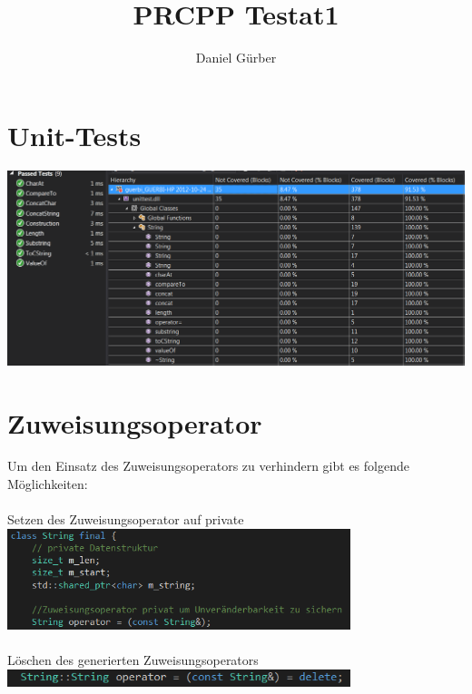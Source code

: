 \documentclass[a4paper,10pt]{article}
\title{PRCPP Testat1}
\author{Daniel G\"urber}
\begin{document}
\maketitle
\newpage
\section{Unit-Tests}
\includegraphics[width=150mm]{unit.png}
\section{Zuweisungsoperator}
Um den Einsatz des Zuweisungsoperators zu verhindern gibt es folgende M\"oglichkeiten: \\ \\
Setzen des Zuweisungsoperator auf private\\
\includegraphics[width=100mm]{private.png}\\\\
L\"oschen des generierten Zuweisungsoperators\\
\includegraphics[width=100mm]{delete.png}\\\\
\end{document}
